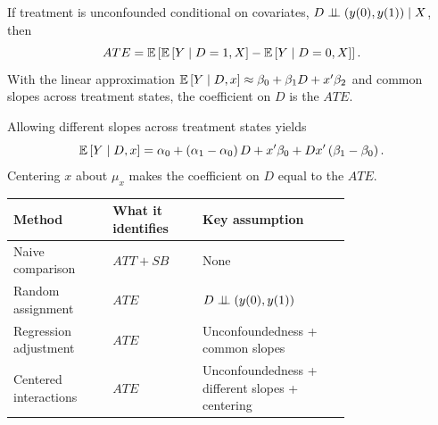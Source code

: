 \begin{remark}
	If treatment is unconfounded conditional on covariates, $D \perp\!\!\!\perp \left(y(0),y(1)\right) \mid X$, then
	\[
		ATE = \mathbb{E}\left[\mathbb{E}\left[Y \mid D=1, X\right] - \mathbb{E}\left[Y \mid D=0, X\right]\right]
	.\]
	With the linear approximation $\mathbb{E}\left[Y \mid D,x\right] \approx \beta_0 + \beta_1 D + x'\beta_2$ and common slopes across treatment states, the coefficient on $D$ is the $ATE$.
\end{remark}

\begin{remark}
	Allowing different slopes across treatment states yields
	\[
		\mathbb{E}\left[Y \mid D, x\right] = \alpha_0 + \left(\alpha_1-\alpha_0\right)D + x'\beta_0 + Dx'\left(\beta_1-\beta_0\right)
	.\]
	Centering $x$ about $\mu_x$ makes the coefficient on $D$ equal to the $ATE$.
	\begin{center}
	\small
	\renewcommand{\arraystretch}{1.1}
	\begin{tabular}{p{0.22\linewidth}p{0.20\linewidth}p{0.33\linewidth}}
		\toprule
		Method & What it identifies & Key assumption \\
		\midrule
		Naive comparison & $ATT + SB$ & None \\
		Random assignment & $ATE$ & $D \perp\!\!\!\perp \left(y(0),y(1)\right)$ \\
		Regression adjustment & $ATE$ & Unconfoundedness + common slopes \\
		Centered interactions & $ATE$ & Unconfoundedness + different slopes + centering \\
		\bottomrule
	\end{tabular}
	\end{center}
\end{remark}
